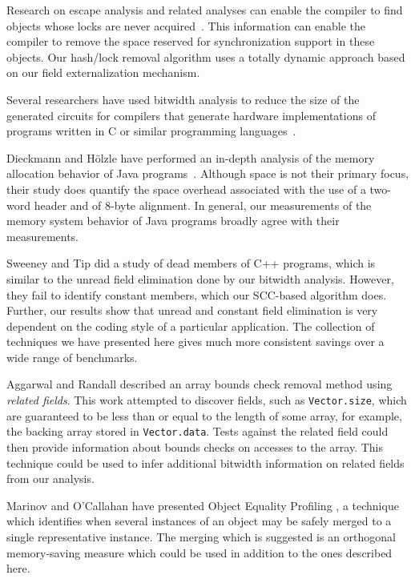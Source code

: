 \documentclass{sig-alt-full}
\begin{document}
Research on escape analysis and related analyses can enable the
compiler to find objects whose locks are never 
acquired~\cite{ACSE99,BH99,whaley99,CGSSM99,Ruf00:PLDI00,salcianu01}.
This information can enable the compiler to remove the space
reserved for synchronization support in these objects. 
Our hash/lock removal algorithm uses a totally dynamic approach
based on our field externalization mechanism. 

Several researchers have used bitwidth analysis to reduce the size
of the generated circuits for compilers that generate hardware
implementations of programs written in C or similar programming 
languages~\cite{ananian:siliconc,ananian99:tech,RR00:PLDI00,stephenson00,BGSW00}.

Dieckmann and H\"olzle have performed an in-depth analysis of the
memory allocation behavior of Java programs~\cite{DH99}. Although 
space is not their primary focus, their study does quantify 
the space overhead associated with the use of a two-word header
and of 8-byte alignment. In general, our measurements of the 
memory system behavior of Java programs broadly agree with their
measurements. 

Sweeney and Tip \cite{SweeneyTip98DeadDataMembers} did a study of dead
members of C++ programs, which is similar to the unread field
elimination done by our bitwidth analysis.  However, they
fail to identify constant members, which our SCC-based algorithm
does.  Further, our results show that unread and constant field
elimination is very dependent on the coding style of a particular
application.  The collection of techniques we have presented here
gives much more consistent savings over a wide range of benchmarks.

Aggarwal and Randall \cite{aggarwal01} described an array bounds check
removal method using {\it related fields}.  This work attempted to
discover fields, such as {\tt Vector.size}, which are guaranteed to be
less than or equal to the length of some array, for example, the
backing array stored in {\tt Vector.data}.  Tests against the related
field could then provide information about bounds checks on accesses
to the array.  This technique could be used to infer additional
bitwidth information on related fields from our analysis.

Marinov and O'Callahan have presented Object Equality Profiling
\cite{marinov03}, a technique which identifies when several instances
of an object may be safely merged to a single representative instance.
The merging which is suggested is an orthogonal memory-saving
measure which could be used in addition to the ones described here.
\end{document}
